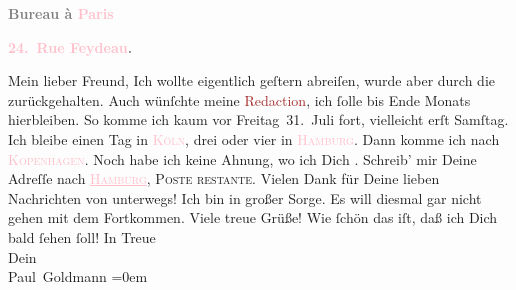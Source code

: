            \pstart
           \begin{otherlanguage}{french}\textcolor{gray}{\textbf{\textbf{Bureau à \textcolor{pink}{Paris}{}\ledrightnote{\textcolor{pink}{Paris}}}}}\end{otherlanguage}\pend
           \pstart
           \begin{otherlanguage}{french}\textcolor{gray}{\textbf{\textbf{\textcolor{pink}{24. Rue Feydeau}{}\ledrightnote{\textcolor{pink}{rue Feydeau}}.}}}\end{otherlanguage}\pend
           \pstart\center{}Mein lieber Freund,\pend\pstart
           Ich wollte eigentlich geſtern abreiſen, wurde aber
               durch die \label{K_L02783-1v}\label{K_L02783-1h} zurückgehalten. Auch wünſchte meine \textcolor{brown}{Redaction}{}, ich ſolle bis Ende Monats hierbleiben. So komme ich kaum vor Freitag 31. Juli fort, vielleicht erſt Samſtag. Ich bleibe einen Tag in \textsc{\textcolor{pink}{Köln}{}\ledrightnote{\textcolor{pink}{Köln}}}, drei oder vier in \textsc{\textcolor{pink}{Hamburg}{}\ledrightnote{\textcolor{pink}{Hamburg}}}. Dann komme ich nach \textsc{\textcolor{pink}{Kopenhagen}{}\ledrightnote{\textcolor{pink}{Kopenhagen}}}. Noch habe ich keine Ahnung, wo {\pb}ich Dich
                  \label{K_L02783-2v}\label{K_L02783-2h}. Schreib’ mir Deine Adreſſe nach \textsc{\textcolor{pink}{\uline{Hamburg}}{}\ledrightnote{\textcolor{pink}{Hamburg}}}, \textsc{Poste restante}. Vielen Dank für Deine lieben
               Nachrichten von unterwegs! Ich bin in großer Sorge. Es will diesmal gar nicht gehen
               mit dem Fortkommen.\pend
           \pstart
           Viele treue Grüße!\pend
           \pstart
           Wie ſchön das iſt, daß ich Dich bald ſehen ſoll!\pend
           \pstart
           In Treue {\\[\baselineskip]}Dein {\\[\baselineskip]}\spacefill\mbox{Paul Goldmann}\pend
           \leftskip=0em{}\endnumbering{}\begin{anhang}\end{anhang}
      